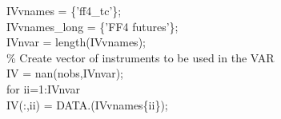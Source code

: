 \hspace{1mm}\hspace{5mm} \hspace{5mm} \hspace{5mm} \hspace{5mm} \hspace{5mm} IVvnames      = \{\textcolor{matlabpurple}{'ff4\_tc'}\}; \\ 
\hspace{1mm}\hspace{5mm} \hspace{5mm} \hspace{5mm} \hspace{5mm} \hspace{5mm} IVvnames\_long = \{\textcolor{matlabpurple}{'FF4 futures'}\}; \\ 
\hspace{1mm}\hspace{5mm} \hspace{5mm} \hspace{5mm} \hspace{5mm} \hspace{5mm} IVnvar        = length(IVvnames); \\ 
\hspace{1mm}\hspace{5mm} \hspace{5mm} \hspace{5mm} \hspace{5mm} \hspace{5mm} \textcolor{matlabgreen}{\% Create vector of instruments to be used in the VAR }\\ 
\hspace{1mm}\hspace{5mm} \hspace{5mm} \hspace{5mm} \hspace{5mm} \hspace{5mm} IV = nan(nobs,IVnvar); \\ 
\hspace{1mm}\hspace{5mm} \hspace{5mm} \hspace{5mm} \hspace{5mm} \hspace{5mm} \textcolor{matlabblue}{for} ii=1:IVnvar \\ 
\hspace{1mm}\hspace{5mm} \hspace{5mm} \hspace{5mm} \hspace{5mm} \hspace{5mm} \hspace{5mm} IV(:,ii) = DATA.(IVvnames\{ii\}); \\ 
